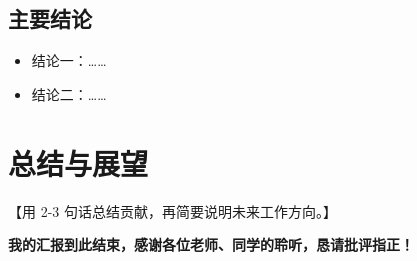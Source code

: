 \documentclass[12pt,a4paper]{article}
\begin{document}
\subsection{主要结论}
\begin{itemize}
    \item 结论一：……
    \item 结论二：……
\end{itemize}

\section*{总结与展望}
【用 2-3 句话总结贡献，再简要说明未来工作方向。】

\vspace{0.5cm}
\textbf{我的汇报到此结束，感谢各位老师、同学的聆听，恳请批评指正！}
\end{document}
